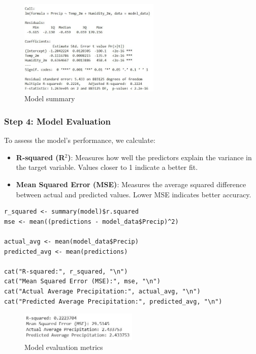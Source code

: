 \begin{figure}[h]
\centering
\includegraphics[width=0.6\textwidth]{figures/regression.jpg}
\caption{Model summary}
\end{figure}

\subsubsection*{Step 4: Model Evaluation}

To assess the model’s performance, we calculate:

\begin{itemize}
  \item \textbf{R-squared (R\(^2\))}: Measures how well the predictors explain the variance in the target variable. Values closer to 1 indicate a better fit.
  \item \textbf{Mean Squared Error (MSE)}: Measures the average squared difference between actual and predicted values. Lower MSE indicates better accuracy.
\end{itemize}

\begin{verbatim}
r_squared <- summary(model)$r.squared
mse <- mean((predictions - model_data$Precip)^2)

actual_avg <- mean(model_data$Precip)
predicted_avg <- mean(predictions)

cat("R-squared:", r_squared, "\n")
cat("Mean Squared Error (MSE):", mse, "\n")
cat("Actual Average Precipitation:", actual_avg, "\n")
cat("Predicted Average Precipitation:", predicted_avg, "\n")
\end{verbatim}

\begin{figure}[h]
\centering
\includegraphics[width=0.5\textwidth]{figures/r_square.jpg}
\caption{Model evaluation metrics}
\end{figure}

